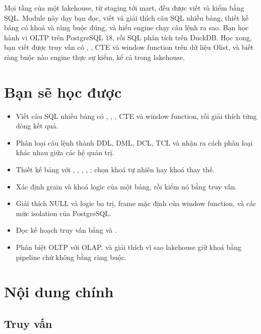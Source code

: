 
Mọi tầng của một lakehouse, từ staging tới mart, đều được viết và kiểm bằng SQL. Module này dạy bạn đọc, viết và giải thích câu SQL nhiều bảng, thiết kế bảng có khoá và ràng buộc đúng, và hiểu engine chạy câu lệnh ra sao. Bạn học hành vi OLTP trên PostgreSQL 18, rồi SQL phân tích trên DuckDB. Học xong, bạn viết được truy vấn có , , CTE và window function trên dữ liệu Olist, và biết ràng buộc nào engine thực sự kiểm, kể cả trong lakehouse.

\section{Bạn sẽ học được}

\begin{itemize}
  \item Viết câu SQL nhiều bảng có , , , CTE và window function, rồi giải thích từng dòng kết quả.
  \item Phân loại câu lệnh thành DDL, DML, DCL, TCL và nhận ra cách phân loại khác nhau giữa các hệ quản trị.
  \item Thiết kế bảng với , , , , ; chọn khoá tự nhiên hay khoá thay thế.
  \item Xác định grain và khoá logic của một bảng, rồi kiểm nó bằng truy vấn.
  \item Giải thích NULL và logic ba trị, frame mặc định của window function, và các mức isolation của PostgreSQL.
  \item Đọc kế hoạch truy vấn bằng  và .
  \item Phân biệt OLTP với OLAP, và giải thích vì sao lakehouse giữ khoá bằng pipeline chứ không bằng ràng buộc.
\end{itemize}

\section{Nội dung chính}

\subsection{Truy vấn}

